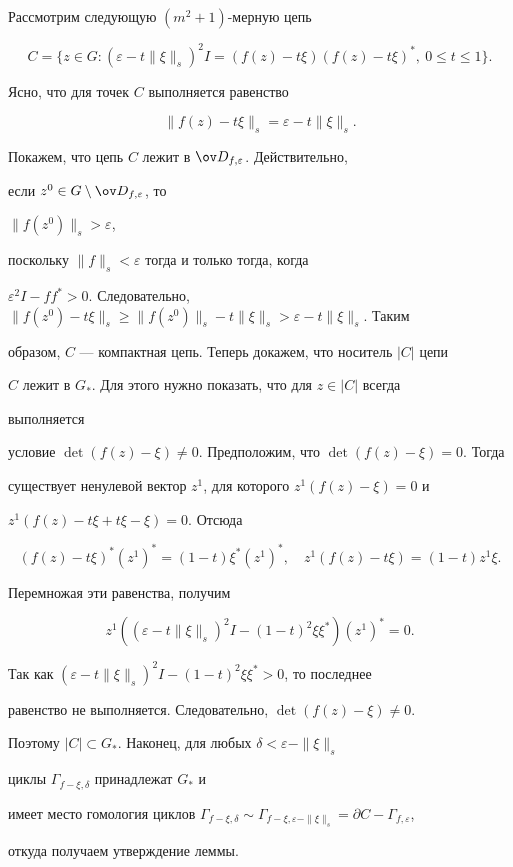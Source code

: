 \begin{pf} 


Рассмотрим следующую $(m^2+1)$-мерную цепь 


$$ 


C=\{z\in G:(\varepsilon-t\|\xi\|_s)^2I= 


(f(z)-t\xi)(f(z)-t\xi)^*,\ 0\le t\le 1\}. 


$$ 


 


Ясно, что для точек $C$ выполняется равенство 


$$ 


\|f(z)-t\xi\|_s=\varepsilon-t\|\xi\|_s. 


$$ 


Покажем, что цепь $C$ лежит в $\ov D_{f,\varepsilon}$. Действительно, 


если $z^0\in G\setminus\ov D_{f,\varepsilon}$, то 


$\|f(z^0)\|_s>\varepsilon$, 


поскольку $\|f\|_s<\varepsilon$ тогда и только тогда, когда 


$\varepsilon^2I-f f^*>0$. Следовательно, $\|f(z^0)-t\xi\|_s\ge 


\|f(z^0)\|_s-t\|\xi\|_s>\varepsilon-t\|\xi\|_s$. Таким 


образом, $C$ --- компактная цепь. Теперь докажем, что носитель $|C|$ цепи 


$C$ лежит в $G_*$. Для этого нужно показать, что для $z\in|C|$ всегда 


выполняется 


условие $\det(f(z)-\xi)\ne0$. Предположим, что $\det(f(z)-\xi)=0$. Тогда 


существует ненулевой вектор $z^1$, для которого $z^1(f(z)-\xi)=0$ и 


$z^1(f(z)-t\xi+t\xi-\xi)=0$. Отсюда 


$$ 


(f(z)-t\xi)^*(z^1)^*=(1-t)\xi^*(z^1)^*,\quad 


z^1(f(z)-t\xi)=(1-t)z^1\xi. 


$$ 


Перемножая эти равенства, получим 


$$ 


z^1((\varepsilon-t\|\xi\|_s)^2I- 


(1-t)^2\xi\xi^*)(z^1)^*=0. 


$$ 


Так как $(\varepsilon-t\|\xi\|_s)^2I-(1-t)^2\xi\xi^*>0$, то последнее 


равенство не выполняется. Следовательно, $\det(f(z)-\xi)\ne0$. 


Поэтому $|C|\subset G_*$. Наконец, для любых $\delta<\varepsilon-\|\xi\|_s$ 


циклы $\Gamma_{f-\xi,\delta}$ принадлежат $G_*$ и 


имеет место гомология циклов $\Gamma_{f-\xi,\delta}\sim 


\Gamma_{f-\xi,\varepsilon-\|\xi\|_s}=\partial C-\Gamma_{f,\varepsilon}$, 


откуда получаем утверждение леммы. 


\end{pf} 


